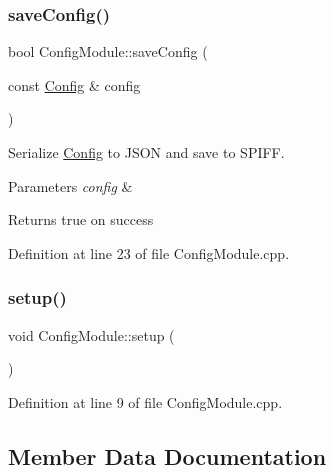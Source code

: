 \mbox{\label{class_config_module_ab7b7cb9aba4ab90bec664eef2b4a00f3}} 
\subsubsection{\texorpdfstring{saveConfig()}{saveConfig()}}
{\footnotesize\ttfamily bool Config\+Module\+::save\+Config (\begin{DoxyParamCaption}\item[{const \mbox{\hyperlink{struct_config}{Config}} \&}]{config }\end{DoxyParamCaption})}



Serialize \mbox{\hyperlink{struct_config}{Config}} to J\+S\+ON and save to S\+P\+I\+FF. 


\begin{DoxyParams}{Parameters}
{\em config} & \\
\hline
\end{DoxyParams}
\begin{DoxyReturn}{Returns}
true on success 
\end{DoxyReturn}


Definition at line 23 of file Config\+Module.\+cpp.

\mbox{\label{class_config_module_a3ab8220b02e11fdb12af8111ef77c6ac}} 
\subsubsection{\texorpdfstring{setup()}{setup()}}
{\footnotesize\ttfamily void Config\+Module\+::setup (\begin{DoxyParamCaption}{ }\end{DoxyParamCaption})}



Definition at line 9 of file Config\+Module.\+cpp.



\subsection{Member Data Documentation}
\mbox{\label{class_config_module_a0738d7b1088e75c5503a894e88d439aa}} 
